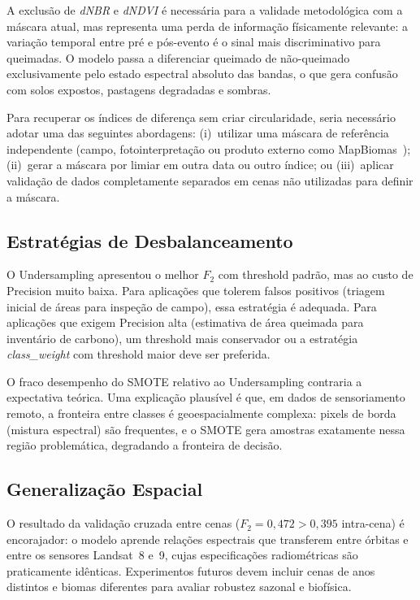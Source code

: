 \documentclass[conference]{IEEEtran}
\begin{document}
A exclusão de \textit{dNBR} e \textit{dNDVI} é necessária para a validade
metodológica com a máscara atual, mas representa uma perda de informação
físicamente relevante: a variação temporal entre pré e pós-evento é o
sinal mais discriminativo para queimadas. O modelo passa a diferenciar
queimado de não-queimado exclusivamente pelo estado espectral absoluto
das bandas, o que gera confusão com solos expostos, pastagens degradadas
e sombras.

Para recuperar os índices de diferença sem criar circularidade, seria
necessário adotar uma das seguintes abordagens:
(i)~utilizar uma máscara de referência independente (campo,
fotointerpretação ou produto externo como MapBiomas~\cite{b6});
(ii)~gerar a máscara por limiar em outra data ou outro índice; ou
(iii)~aplicar validação de dados completamente separados em cenas
não utilizadas para definir a máscara.

\subsection{Estratégias de Desbalanceamento}

O Undersampling apresentou o melhor $F_2$ com threshold padrão, mas ao
custo de Precision muito baixa. Para aplicações que tolerem falsos positivos
(triagem inicial de áreas para inspeção de campo), essa estratégia é
adequada. Para aplicações que exigem Precision alta (estimativa de área
queimada para inventário de carbono), um threshold mais conservador ou
a estratégia \textit{class\_weight} com threshold maior deve ser preferida.

O fraco desempenho do SMOTE relativo ao Undersampling contraria a expectativa
teórica. Uma explicação plausível é que, em dados de sensoriamento remoto,
a fronteira entre classes é geoespacialmente complexa: pixels de borda
(mistura espectral) são frequentes, e o SMOTE gera amostras exatamente
nessa região problemática, degradando a fronteira de decisão.

\subsection{Generalização Espacial}

O resultado da validação cruzada entre cenas ($F_2 = 0{,}472 > 0{,}395$
intra-cena) é encorajador: o modelo aprende relações espectrais que
transferem entre órbitas e entre os sensores Landsat~8 e~9, cujas
especificações radiométricas são praticamente idênticas. Experimentos
futuros devem incluir cenas de anos distintos e biomas diferentes
para avaliar robustez sazonal e biofísica.
\end{document}
